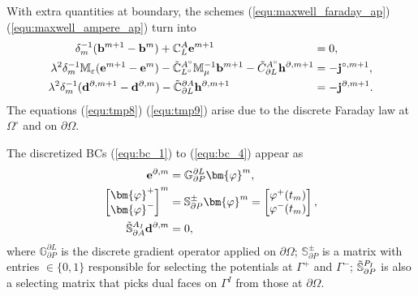 \documentclass{article}
\begin{document}
With extra quantities at boundary, the schemes (\ref{equ:maxwell_faraday_ap}) (\ref{equ:maxwell_ampere_ap}) turn into
\begin{align}
    \delta_m^{-1} (\mathbf{b}^{m+1} - \mathbf{b}^{m}) + \mathbb{C}_L^A\mathbf{e}^{m+1} \hspace{3.08cm}&= 0, \label{equ:tmp7}\\
    \lambda^2\delta_m^{-1}\mathbb{M}_\varepsilon(\mathbf{e}^{m+1} - \mathbf{e}^m) - \Tilde{\mathbb{C}}_{L^\circ}^{A^\circ}\mathbb{M}_\mu^{-1}\mathbf{b}^{m+1} - \Tilde{C}^{A^\circ}_{\partial L} \mathbf{h}^{\partial, m+1} &= - \mathbf{j}^{\circ,m+1}, \label{equ:tmp8}\\
     \lambda^2\delta_m^{-1}(\mathbf{d}^{\partial,m+1} - \mathbf{d}^{\partial, m}) - \Tilde{\mathbb{C}}^{\partial A}_{\partial L} \mathbf{h}^{\partial,m+1} \hspace{2.60cm}&= - \mathbf{j}^{\partial,m+1}. \label{equ:tmp9}
\end{align}
The equations (\ref{equ:tmp8}) (\ref{equ:tmp9}) arise due to the discrete Faraday law at $\Omega^\circ$ and on $\partial \Omega$. 

The discretized BCs (\ref{equ:bc_1}) to (\ref{equ:bc_4}) appear as
\begin{align}
    \mathbf{e}^{\partial,m} &= \mathbb{G}^{\partial L}_{\partial P} \bm{\varphi}^m, \label{equ:tmp10}\\
    \begin{bmatrix}
    \bm{\varphi}^+ \\
    \bm{\varphi}^- 
    \end{bmatrix}^m &= \mathbb{S}^{\pm}_{\partial P} \bm{\varphi}^m =
    \begin{bmatrix}
    \varphi^+(t_m) \\
    \varphi^-(t_m) 
    \end{bmatrix},\label{equ:tmp11}\\
    \Tilde{\mathbb{S}}^{A_I}_{\partial A} \mathbf{d}^{\partial,m} &= 0, \label{equ:tmp12}
\end{align}
where $\mathbb{G}^{\partial L}_{\partial P}$ is the discrete gradient operator applied on $\partial \Omega$;
$\mathbb{S}^{\pm}_{\partial P}$ is a matrix with entries $\in \{0,1\}$ responsible for selecting the potentials at $\Gamma^+$ and $\Gamma^-$; $\Tilde{\mathbb{S}}^{P_I}_{\partial P}$ is also a selecting matrix that picks dual faces on $\Gamma^I$ from those at $\partial\Omega$. 
\end{document}

